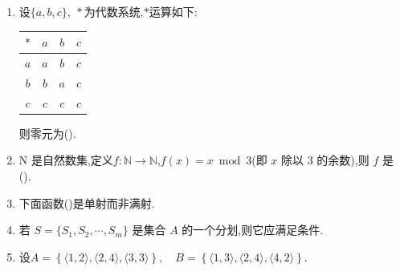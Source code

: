 \begin{enumerate}
	\item 设$\{a,b,c\},\ *$为代数系统,$*$运算如下:
	\begin{table}[H]
		\centering
		\begin{tabular}{|c|c|c|c|}
			\hline
			$*$ & $a$ & $b$ & $c$ \\
			\hline
			$a$ & $a$ & $b$ & $c$ \\
			\hline
			$b$ & $b$ & $a$ & $c$ \\
			\hline
			$c$ & $c$ & $c$ & $c$ \\
			\hline
		\end{tabular}
	\end{table}
	
	则零元为(\qquad).
	
	\item N 是自然数集,定义\(f:\mathbb{N}\to\mathbb{N}\),\(f(x)=x \bmod 3\)(即 \(x\) 除以 \(3\) 的余数),则 \(f\) 是(\quad).
	
	\item 下面函数(\quad)是单射而非满射.
	
	\item 若 $S=\{S_1,S_2,\cdots,S_m\}$ 是集合 $A$ 的一个分划,则它应满足条件\underline{\hspace{3cm}}.
	
	
	\item 设$A = \left\{\langle 1,2\rangle,\langle 2,4\rangle,\langle 3,3\rangle\right\},\quad B = \left\{\langle 1,3\rangle,\langle 2,4\rangle,\langle 4,2\rangle\right\}.$ 
	

\end{enumerate}

